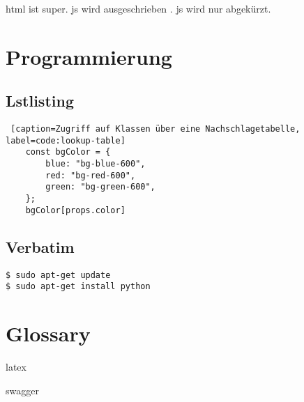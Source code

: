 \ac{html} ist super. \acf{js} wird ausgeschrieben . \acs{js} wird nur abgekürzt.

\chapter{Programmierung}

\section{Lstlisting}

\begin{lstlisting} [caption=Zugriff auf Klassen über eine Nachschlagetabelle, label=code:lookup-table]
    const bgColor = {
        blue: "bg-blue-600",
        red: "bg-red-600",
        green: "bg-green-600",
    };
    bgColor[props.color]
\end{lstlisting}

\section{Verbatim}

\begin{verbatim}
$ sudo apt-get update
$ sudo apt-get install python
\end{verbatim}

\chapter{Glossary}

\gls{latex}

\gls{swagger}
